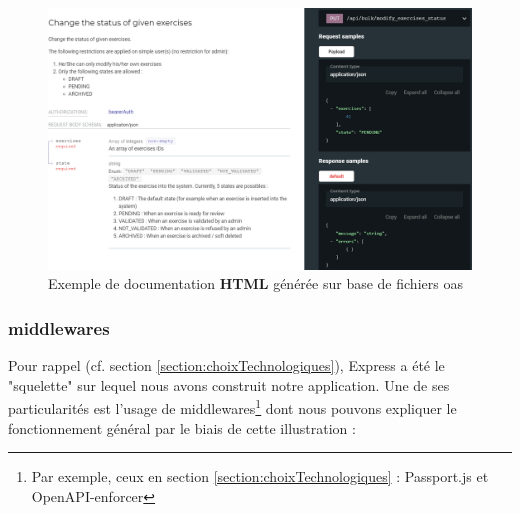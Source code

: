 \begin{figure}[H]
    \includegraphics[width=\textwidth,height=0.44\textheight,keepaspectratio]{images/serveur/doc_example.png}
    \centering
    \caption{Exemple de documentation \textbf{HTML} générée sur base de fichiers \Gls{oas}}
    \label{fig:exampleDoc}
\end{figure}

\pagebreak
\subsubsection{\Glspl{middleware}}

Pour rappel (cf. section \ref{section:choixTechnologiques}), Express a été le "squelette" sur lequel nous avons construit notre application.
Une de ses particularités est l'usage de \glspl{middleware}\footnote{
    Par exemple, ceux en section \ref{section:choixTechnologiques} : Passport.js et OpenAPI-enforcer
} dont nous pouvons expliquer le fonctionnement général par le biais de cette illustration :

